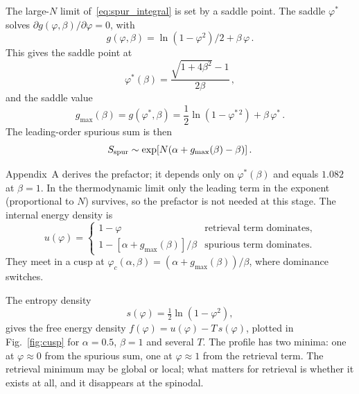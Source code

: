 \documentclass[letterpaper]{article} %
\newcommand{\Bnet}{\beta}
\newcommand{\p}{\partial}
\begin{document}
The large-$N$ limit of~\eqref{eq:spur_integral} is set by a saddle point.
The saddle $\varphi^*$ solves $\p g(\varphi, \Bnet)/\p\varphi = 0$, with
\begin{equation}
    g(\varphi, \Bnet) = \ln(1-\varphi^2)/2 + \Bnet\,\varphi\,.
\end{equation}
This gives the saddle point at
\begin{equation}
\varphi^*(\Bnet) = \frac{\sqrt{1+4\Bnet^2}-1}{2\Bnet}\,,
\label{eq:saddle}
\end{equation}  
and the saddle value
\begin{equation}
g_{\max}(\Bnet) = g(\varphi^*, \Bnet) = \frac12 \ln(1 - \varphi^{*\,2}) + \Bnet\,\varphi^*\,.
\label{eq:saddle_value}
\end{equation} 
The leading-order spurious sum is then
\begin{equation}
    S_{\rm spur} \sim \exp[N(\alpha + g_{\max}(\Bnet) - \Bnet)]\,.
    \label{eq:spurious_saddle}
\end{equation}

Appendix~A derives the prefactor; it depends only on $\varphi^*(\Bnet)$ and
equals $1.082$ at $\Bnet=1$. In the thermodynamic limit only the leading term in the exponent (proportional to $N$)
survives, so the prefactor is not needed at this stage. The internal energy density is
\begin{equation}
    u(\varphi) = \begin{cases}
        1 - \varphi & \text{retrieval term dominates}, \\
        1 - [\alpha + g_{\max}(\Bnet)]/\Bnet & \text{spurious term dominates}.
    \end{cases}
    \label{eq:u_piecewise}
\end{equation} They meet in a cusp at $\varphi_c(\alpha, \Bnet) = (\alpha + g_{\max}(\Bnet))/\Bnet$,
where dominance switches.

The entropy density~\citep{icml2026theory}
\begin{equation}
    s(\varphi) = \tfrac{1}{2} \ln(1-\varphi^2),
    \label{eq:entropy}
\end{equation}
gives the free energy density $f(\varphi) = u(\varphi) - T\,s(\varphi)$, plotted in
Fig.~\ref{fig:cusp} for $\alpha=0.5$, $\Bnet=1$ and several $T$. The profile has two minima: one at $\varphi\approx 0$ from the spurious sum, one at
$\varphi\approx 1$ from the retrieval term. The retrieval minimum may be global or
local; what matters for retrieval is whether it exists at all, and it disappears at
the spinodal.
\end{document}
